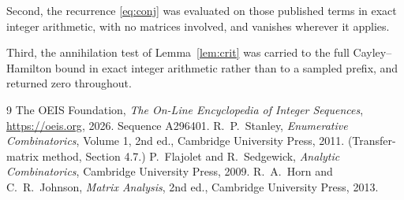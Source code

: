 \documentclass[11pt,a4paper]{article}
\theoremstyle{plain}
\theoremstyle{definition}
\begin{document}
Second, the recurrence \eqref{eq:conj} was evaluated on those published terms in exact
integer arithmetic, with no matrices involved, and vanishes wherever it applies.

Third, the annihilation test of Lemma~\ref{lem:crit} was carried to the full
Cayley--Hamilton bound in exact integer arithmetic rather than to a sampled prefix, and
returned zero throughout.

\begin{thebibliography}{9}
 The OEIS Foundation, \emph{The On-Line Encyclopedia of Integer
Sequences}, \url{https://oeis.org}, 2026. Sequence A296401.
 R.~P.~Stanley, \emph{Enumerative Combinatorics}, Volume 1, 2nd ed.,
Cambridge University Press, 2011. (Transfer-matrix method, Section 4.7.)
 P.~Flajolet and R.~Sedgewick, \emph{Analytic Combinatorics}, Cambridge
University Press, 2009.
 R.~A.~Horn and C.~R.~Johnson, \emph{Matrix Analysis}, 2nd ed., Cambridge
University Press, 2013.
\end{thebibliography}
\end{document}
